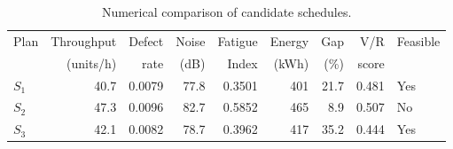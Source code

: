 \begin{table}[htbp]
\centering
\caption{Numerical comparison of candidate schedules.}
\label{tab:numerical-sim}
\small
\begin{tabular}{@{}lrrrrrrrl@{}}
\toprule
Plan & Throughput & Defect & Noise & Fatigue & Energy & Gap & V/R & Feasible \\
     & (units/h)  & rate   & (dB)  & Index   & (kWh)  & (\%) & score &         \\
\midrule
$S_{1}$ & 40.7 & 0.0079 & 77.8 & 0.3501 & 401 & 21.7 & 0.481 & Yes \\
$S_{2}$ & 47.3 & 0.0096 & 82.7 & 0.5852 & 465 & 8.9 & 0.507 & No \\
$S_{3}$ & 42.1 & 0.0082 & 78.7 & 0.3962 & 417 & 35.2 & 0.444 & Yes \\
\bottomrule
\end{tabular}
\end{table}
